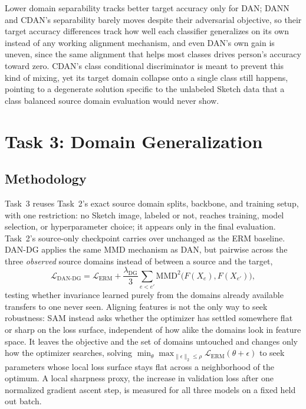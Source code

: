 \documentclass{article}
\begin{document}
Lower domain separability tracks better target accuracy only for DAN;
DANN and CDAN's separability barely moves despite their adversarial
objective, so their target accuracy differences track how well each
classifier generalizes on its own instead of any working alignment
mechanism, and even DAN's own gain is uneven, since the same alignment
that helps most classes drives person's accuracy toward zero. CDAN's
class conditional discriminator is meant to prevent this kind of mixing,
yet its target domain collapse onto a single class still happens,
pointing to a degenerate solution specific to the unlabeled Sketch data
that a class balanced source domain evaluation would never show.

\section{Task 3: Domain Generalization}
\label{sec:task3}

\subsection{Methodology}

Task~3 reuses Task~2's exact source domain splits, backbone, and training
setup, with one restriction: no Sketch image, labeled or not, reaches
training, model selection, or hyperparameter choice; it appears only in
the final evaluation. Task~2's source-only checkpoint carries over
unchanged as the ERM baseline. DAN-DG applies the same MMD mechanism as DAN, but pairwise
across the three \emph{observed} source domains instead of between a
source and the target,
\begin{equation}
  \mathcal{L}_{\text{DAN-DG}} = \mathcal{L}_{\text{ERM}} + \frac{\lambda_{\text{DG}}}{3}
  \sum_{e<e'} \mathrm{MMD}^2\big(F(X_e), F(X_{e'})\big),
  \label{eq:dandg}
\end{equation}
testing whether invariance learned purely from the domains already
available transfers to one never seen. Aligning features is not the only
way to seek robustness: SAM instead asks whether the optimizer has
settled somewhere flat or sharp on the loss surface, independent of how
alike the domains look in feature space. It leaves the objective and the
set of domains untouched and changes only how the optimizer searches,
solving $\min_\theta
\max_{\lVert\epsilon\rVert_2\le\rho} \mathcal{L}_{\text{ERM}}(\theta+\epsilon)$
\citep{foret2021sharpnessaware} to seek parameters whose local loss
surface stays flat across a neighborhood of the optimum. A local
sharpness proxy, the increase in validation loss after one normalized
gradient ascent step, is measured for all three models on a fixed held
out batch.
\end{document}
